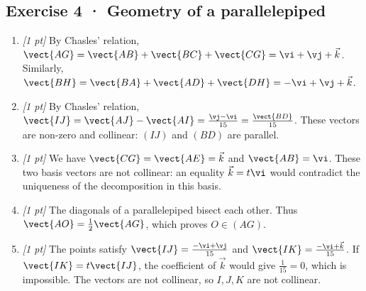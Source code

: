 \subsection*{Exercise 4 · Geometry of a parallelepiped}\begin{enumerate}

\item \textit{[1 pt]} By Chasles' relation, $\vect{AG}=\vect{AB}+\vect{BC}+\vect{CG}=\vi +\vj +\vec k$. Similarly, $\vect{BH}=\vect{BA}+\vect{AD}+\vect{DH}=-\vi +\vj +\vec k$.

\item \textit{[1 pt]} By Chasles' relation, $\vect{IJ}=\vect{AJ}-\vect{AI}=\frac{\vj -\vi }{15}=\frac{\vect{BD}}{15}$. These vectors are non-zero and collinear: $(IJ)$ and $(BD)$ are parallel.

\item \textit{[1 pt]} We have $\vect{CG}=\vect{AE}=\vec k$ and $\vect{AB}=\vi $. These two basis vectors are not collinear: an equality $\vec k=t\vi $ would contradict the uniqueness of the decomposition in this basis.

\item \textit{[1 pt]} The diagonals of a parallelepiped bisect each other. Thus $\vect{AO}=\frac12\vect{AG}$, which proves $O\in(AG)$.

\item \textit{[1 pt]} The points satisfy $\vect{IJ}=\frac{-\vi +\vj }{15}$ and $\vect{IK}=\frac{-\vi +\vec k}{15}$. If $\vect{IK}=t\vect{IJ}$, the coefficient of $\vec k$ would give $\frac{1}{15}=0$, which is impossible. The vectors are not collinear, so $I,J,K$ are not collinear.

\end{enumerate}

\fi

\fi

